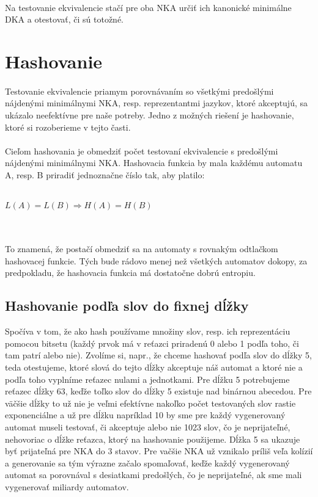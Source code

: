\paragraph{}
Na testovanie ekvivalencie stačí pre oba NKA určiť ich kanonické minimálne DKA a otestovať, či sú totožné.


\section{Hashovanie}

\paragraph{}
Testovanie ekvivalencie priamym porovnávaním so všetkými predošlými nájdenými minimálnymi NKA, resp. reprezentantmi jazykov, ktoré akceptujú, sa ukázalo neefektívne pre naše potreby. Jedno z možných riešení je hashovanie, ktoré si rozoberieme v tejto časti.

\paragraph{}
Cieľom hashovania je obmedziť počet testovaní ekvivalencie s predošlými nájdenými minimálnymi NKA. Hashovacia funkcia by mala každému automatu A, resp. B priradiť jednoznačne číslo tak, aby platilo:
\\
\\
\centerline{$L(A) = L(B) \Rightarrow H(A) = H(B)$}
\\
\\
To znamená, že postačí obmedziť sa na automaty s rovnakým odtlačkom hashovacej funkcie. Tých bude rádovo menej než všetkých automatov dokopy, za predpokladu, že hashovacia funkcia má dostatočne dobrú entropiu.



\label{hashSlova}
\subsection{Hashovanie podľa slov do fixnej dĺžky}
Spočíva v tom, že ako hash používame množiny slov, resp. ich reprezentáciu pomocou bitsetu (každý prvok má v reťazci priradenú 0 alebo 1 podľa toho, či tam patrí alebo nie). Zvolíme si, napr., že chceme hashovať podľa slov do dĺžky 5, teda otestujeme, ktoré slová do tejto dĺžky akceptuje náš automat a ktoré nie a podľa toho vyplníme reťazec nulami a jednotkami. Pre dĺžku 5 potrebujeme reťazec dĺžky 63, keďže toľko slov do dĺžky 5 existuje nad binárnou abecedou. Pre väčšie dĺžky to už nie je veľmi efektívne nakoľko počet testovaných slov rastie exponenciálne a už pre dĺžku napríklad 10 by sme pre každý vygenerovaný automat museli testovať, či akceptuje alebo nie 1023 slov, čo je neprijateľné, nehovoriac o dĺžke reťazca, ktorý na hashovanie použijeme. Dĺžka 5 sa ukazuje byť prijateľná pre NKA do 3 stavov. Pre vačšie NKA už vznikalo príliš veľa kolízií a generovanie sa tým výrazne začalo spomaľovať, keďže každý vygenerovaný automat sa porovnával s desiatkami predošlých, čo je neprijateľné, ak sme mali vygenerovať miliardy automatov.

